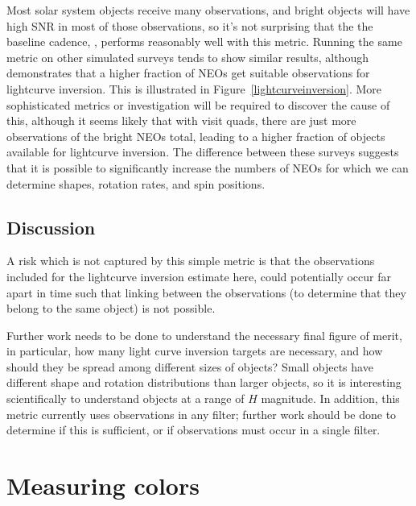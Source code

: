 Most solar system objects receive many observations, and bright
objects will have high SNR in most of those observations, so it's not
surprising that the the baseline cadence, ,
performs reasonably well with this metric. Running the same metric on
other simulated surveys tends to show similar results, although
 demonstrates that a higher fraction
of NEOs get suitable observations for lightcurve inversion. This is
illustrated in Figure~\ref{lightcurveinversion}. More
sophisticated metrics or investigation will be required to discover
the cause of this, although it seems likely that with visit quads,
there are just more observations of the bright NEOs total, leading to
a higher fraction of objects available for lightcurve inversion. The
difference between these surveys suggests that it is possible to
significantly increase the numbers of NEOs for which we can determine
shapes, rotation rates, and spin positions.


\subsection{Discussion}
\label{sec:\secname:discussion}

A risk which is not captured by this simple metric is that the
observations included for the lightcurve inversion estimate here,
could potentially occur far apart in time such that linking between
the observations (to determine that they belong to the same object) is
not possible.

Further work needs to be done to understand the necessary final figure
of merit, in particular, how many light curve inversion targets are
necessary, and how should they be spread among different sizes of
objects? Small objects have different shape and
rotation distributions than larger objects, so it is interesting
scientifically to understand objects at a range of $H$ magnitude. In
addition, this metric currently uses observations in any filter;
further work should be done to determine if this is sufficient, or if
observations must occur in a single filter.

\navigationbar


\section{Measuring colors}
\def\secname{\chpname:colors}\label{sec:\secname}

